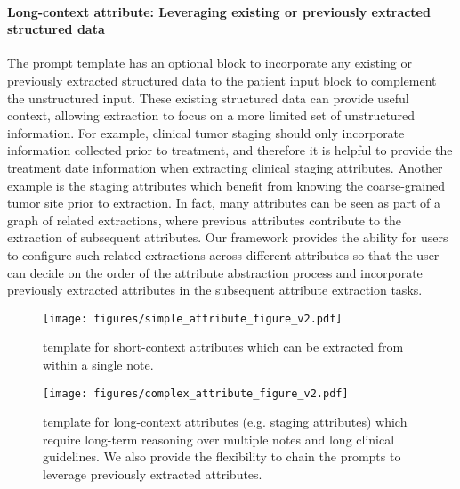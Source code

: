 \paragraph{Long-context attribute: Leveraging existing or previously extracted structured data}
The prompt template has an optional block to incorporate any existing or previously extracted structured data to the patient input block to complement the unstructured input. These existing structured data can provide useful context, allowing extraction to focus on a more limited set of unstructured information. For example, clinical tumor staging should only incorporate information collected prior to treatment, and therefore it is helpful to provide the treatment date information when extracting clinical staging attributes. Another example is the staging attributes which benefit from knowing the coarse-grained tumor site prior to extraction. 
In fact, many attributes can be seen as part of a graph of related extractions, where previous attributes contribute to the extraction of subsequent attributes. Our framework provides the ability for users to configure such related extractions across different attributes so that the user can decide on the order of the attribute abstraction process and incorporate previously extracted attributes in the subsequent attribute extraction tasks. 






















\begin{figure}[t!]
\centering
\texttt{[image: figures/simple\_attribute\_figure\_v2.pdf]}
\caption{\ours template for short-context attributes which can be extracted from within a single note.}
\label{fig:gpt-universal-prompt-template-simple}
\end{figure}

\begin{figure}[t!]
\centering
\texttt{[image: figures/complex\_attribute\_figure\_v2.pdf]}
\caption{\ours template for long-context attributes (e.g. staging attributes) which require long-term reasoning over multiple notes and long clinical guidelines. We also provide the flexibility to chain the prompts to leverage previously extracted attributes.}
\label{fig:gpt-universal-prompt-template-complex}
\end{figure}
